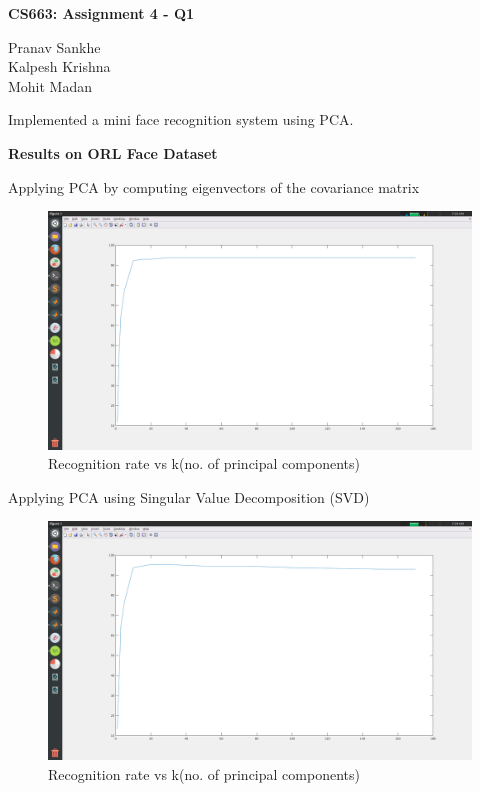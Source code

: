 \documentclass{article}
\begin{document}
{\textbf{CS663: Assignment 4 - Q1}}
\vskip 0.2in

Pranav Sankhe \\ Kalpesh Krishna \\ Mohit Madan 

\vskip 0.5in
Implemented a mini face recognition system using PCA.

\vskip 0.2in

\textbf{Results on ORL Face Dataset}

\vskip 0.5in
Applying PCA by computing eigenvectors of the covariance matrix
\begin{figure}[h!]
  \includegraphics[width=\linewidth]{Q1cov.png}
  \caption{Recognition rate vs k(no. of principal components)}
  \label{fig:result1}
\end{figure}
\newpage
Applying PCA using Singular Value Decomposition (SVD)
\begin{figure}[h!]
  \includegraphics[width=\linewidth]{Q1_svd.png}
  \caption{Recognition rate vs k(no. of principal components)}
  \label{fig:result2}
\end{figure}
\end{document}

